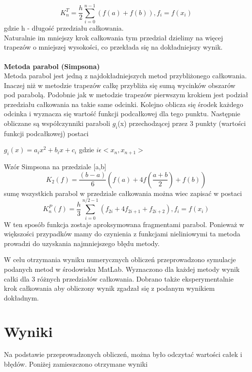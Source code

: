 \documentclass{article}
\begin{document}
	\begin{equation}	
			K_{n}^{T}=\frac{h}{2}\sum_{i=0}^{n-1} \left(f(a)+f(b)\right)  , f_{i} = f\left(x_{i}\right)
			\end{equation}
			gdzie h - długość przedziału całkowania.\\
	
	 Naturalnie im mniejszy krok całkowania tym przedział dzielimy na więcej trapezów o mniejszej wysokości, co przekłada się na dokładniejszy wynik. 
	\\\\
	\textbf {Metoda parabol (Simpsona)}
	\\ 
	Metoda parabol jest jedną z najdokładniejszych metod przybliżonego całkowania. Inaczej niż w metodzie trapezów całkę przybliża się sumą wycinków obszarów pod parabolą. Podobnie jak w metodzie trapezów pierwszym krokiem jest podział przedziału całkowania na takie same odcinki. Kolejno oblicza się środek każdego odcinka i wyznacza się wartość funkcji podcałkowej dla tego punktu. Następnie obliczane są współczynniki paraboli $g_{i}$(x) przechodzącej przez 3 punkty (wartości funkcji podcałkowej) postaci
\begin{center}$g_{i}(x)=a_{i}x^{2}+b_{i}x+c_{i} $ gdzie $i\epsilon<x_{n},x_{n+1}>$ \end{center}
	Wzór Simpsona na przedziale [a,b]
	\begin{equation}
	K_{2}(f)=\frac{(b-a)}{6}(f(a)+4f(\frac{a+b}{2})+f(b)) 
	\end{equation}
	sumę wszystkich parabol w przedziale całkowania można wiec zapisać w postaci
		\begin{equation}
	K_{n}^{P}(f)=\frac{h}{3}\sum_{i=0}^{n/2-1}(f_{2i}+4f_{2i+1}+f_{2i+2}), f_{i} = f\left(x_{i}\right) 
	\end{equation}
	 W ten sposób funkcja zostaje aproksymowana fragmentami parabol. Ponieważ w większości przypadków mamy do czynienia z funkcjami nieliniowymi ta metoda prowadzi do uzyskania najmniejszego błędu metody.  
	 
	 
	W celu otrzymania wyniku numerycznych obliczeń przeprowadzono symulacje podanych metod w środowisku MatLab. Wyznaczono dla każdej metody wynik całki dla 3 różnych przedziałów całkowania. Dobrano także eksperymentalnie krok całkowania aby obliczony wynik zgadzał się z podanym wynikiem dokładnym.
	

	
	\section{Wyniki}
	Na podstawie przeprowadzonych obliczeń, można było odczytać wartości całek i błędów. Poniżej zamieszczono otrzymane wyniki
	
\end{document}
